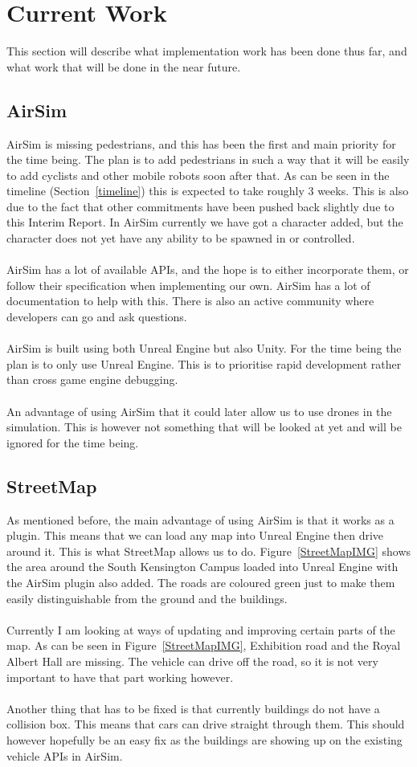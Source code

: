 \section{Current Work}
This section will describe what implementation work has been done thus far, and what work that will be done in the near future.
\subsection{AirSim}
AirSim is missing pedestrians, and this has been the first and main priority for the time being. The plan is to add pedestrians in such a way that it will be easily to add cyclists and other mobile robots soon after that. As can be seen in the timeline (Section~\ref{timeline}) this is expected to take roughly 3 weeks. This is also due to the fact that other commitments have been pushed back slightly due to this Interim Report. In AirSim currently we have got a character added, but the character does not yet have any ability to be spawned in or controlled.
\\~\\
AirSim has a lot of available APIs, and the hope is to either incorporate them, or follow their specification when implementing our own. AirSim has a lot of documentation to help with this. There is also an active community where developers can go and ask questions. 
\\~\\
AirSim is built using both Unreal Engine but also Unity. For the time being the plan is to only use Unreal Engine. This is to prioritise rapid development rather than cross game engine debugging. 
\\~\\
An advantage of using AirSim that it could later allow us to use drones in the simulation. This is however not something that will be looked at yet and will be ignored for the time being. 

\subsection{StreetMap}
As mentioned before, the main advantage of using AirSim is that it works as a plugin. This means that we can load any map into Unreal Engine then drive around it. This is what StreetMap allows us to do. Figure~\ref{StreetMapIMG} shows the area around the South Kensington Campus loaded into Unreal Engine with the AirSim plugin also added. The roads are coloured green just to make them easily distinguishable from the ground and the buildings. 
\\~\\
Currently I am looking at ways of updating and improving certain parts of the map. As can be seen in Figure~\ref{StreetMapIMG}, Exhibition road and the Royal Albert Hall are missing. The vehicle can drive off the road, so it is not very important to have that part working however.
\\~\\
Another thing that has to be fixed is that currently buildings do not have a collision box. This means that cars can drive straight through them. This should however hopefully be an easy fix as the buildings are showing up on the existing vehicle APIs in AirSim.  

